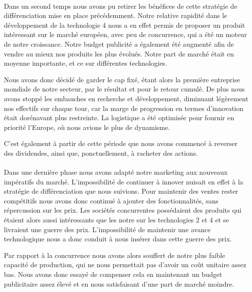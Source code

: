 \documentclass[a4paper,11pt]{article}
\theoremstyle{remark}
\begin{document}
	\paragraph{}%
	Dans un second temps nous avons pu retirer les bénéfices de cette stratégie de différenciation mise en place précédemment.
	Notre relative rapidité dans le développement de la technologie 4 nous a en effet permis de proposer un produit intéressant sur le marché européen, avec peu de concurrence, qui a été un moteur de notre croissance.
	Notre budget publicité a également été augmenté afin de vendre au mieux nos produits les plus évolués.
	Notre part de marché était en moyenne importante, et ce sur différentes technologies.
	
	Nous avons donc décidé de garder le cap fixé, étant alors la première entreprise mondiale de notre secteur, par le résultat et pour le retour cumulé.
	De plus nous avons stoppé les embauches en recherche et développement, diminuant légèrement nos effectifs sur chaque tour, car la marge de progression en termes d'innovation était dorénavant plus restreinte.
	La logistique a été optimisée pour fournir en priorité l'Europe, où nous avions le plus de dynamisme.

	C'est également à partir de cette période que nous avons commencé à reverser des dividendes, ainsi que, ponctuellement, à racheter des actions.

	\paragraph{} %
	Dans une dernière phase nous avons adapté notre marketing aux nouveaux impératifs du marché.
	L'impossibilité de continuer à innover nuisait en effet à la stratégie de différenciation que nous suivions.
	Pour maintenir des ventes rester compétitifs nous avons donc continué à ajouter des fonctionnalités, sans répercussion sur les prix.
	Les sociétés concurrentes possédaient des produits qui étaient alors aussi intéressants que les notre sur les technologies 2 et 4 et se livraient une guerre des prix.
	L'impossibilité de maintenir une avance technologique nous a donc conduit à nous insérer dans cette guerre des prix.

	Par rapport à la concurrence nous avons alors souffert de notre plus faible capacité de production, qui ne nous permettait pas d'avoir un coût unitaire assez bas.
	Nous avons donc essayé de compenser cela en maintenant un budget publicitaire assez élevé et en nous satisfaisant d'une part de marché moindre.
\end{document}
